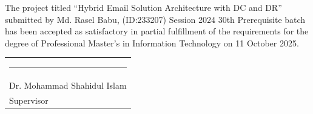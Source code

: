 The project titled “Hybrid Email Solution Architecture with DC and DR” submitted by Md. Rasel Babu, (ID:233207) Session 2024 30th Prerequisite batch has been accepted as satisfactory in partial fulfillment of the requirements for the degree of Professional Master’s in Information Technology on 11 October 2025.

\bigskip
\bigskip
\bigskip
\noindent \begin{tabular}{l}
  \rule{4cm}{1pt} \\
  Dr. Mohammad Shahidul Islam\\ %
  Supervisor\\
\end{tabular}

